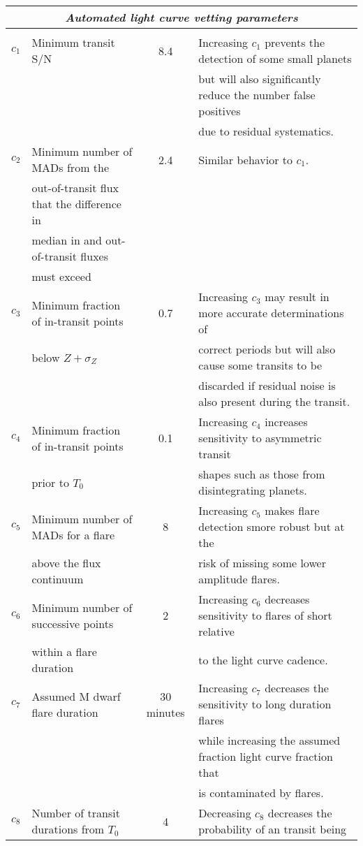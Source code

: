 \begin{landscape}
\begin{table*}
\begin{tabular}{clcl}
    \multicolumn{4}{c}{\emph{Automated light curve vetting parameters}} \\
    \hline \\
    $c_1$ & Minimum transit S/N & 8.4 & Increasing $c_1$ prevents the detection of some small planets \\
    &&& but will also significantly reduce the number false positives \\
    &&& due to residual systematics. \\
    $c_2$ & Minimum number of MADs from the & 2.4 &
    Similar behavior to $c_1$. \\
    & out-of-transit flux that the difference in && \\
    & median in and out-of-transit fluxes  && \\
    & must exceed && \\
    $c_3$ & Minimum fraction of in-transit points & 0.7 &
    Increasing $c_3$ may result in more accurate determinations of \\
    & below $Z+\sigma_Z$ &&
    correct periods but will also cause some transits to be \\
    &&& discarded if residual noise is also present during the transit.  \\
    $c_4$ & Minimum fraction of in-transit points & 0.1 &
    Increasing $c_4$ increases sensitivity to asymmetric transit \\
    & prior to $T_0$ && 
    shapes such as those from disintegrating planets. \\
    $c_5$ & Minimum number of MADs for a flare & 8 &
    Increasing $c_5$ makes flare detection smore robust but at the \\
    & above the flux continuum &&
    risk of missing some lower amplitude flares. \\
    $c_6$ & Minimum number of successive points & 2 &
    Increasing $c_6$ decreases sensitivity to flares of short relative \\
    & within a flare duration & & to the light curve cadence. \\
    $c_7$ & Assumed M dwarf flare duration & 30 minutes &
    Increasing $c_7$ decreases the sensitivity to long duration flares \\
    &&& while increasing the assumed fraction light curve fraction that \\
    &&& is contaminated by flares. \\
    $c_8$ & Number of transit durations from $T_0$ & 4 &
    Decreasing $c_8$ decreases the probability of an transit being \\

\end{tabular}
\end{table*}
\end{landscape}
